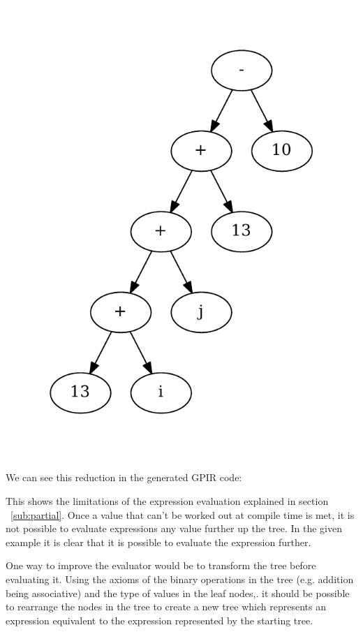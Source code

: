 \begin{center}
\includegraphics[scale=0.5]{graphs/futureTree.pdf}
\end{center}

We can see this reduction in the generated GPIR code:



This shows the limitations of the expression evaluation explained in section ~\ref{sub:partial}.
Once a value that can't be worked out at compile time is met, it is not possible
to evaluate expressions any value further up the tree. In the given example
it is clear that it is possible to evaluate the expression further.

One way to improve the evaluator would be to transform the tree before evaluating it.
Using the axioms of the binary operations in the tree (e.g. addition being associative)
and the type of values in the leaf nodes,. it should be possible to rearrange the nodes in the 
tree to create a new tree which represents an expression equivalent to the expression
represented by the starting tree.

